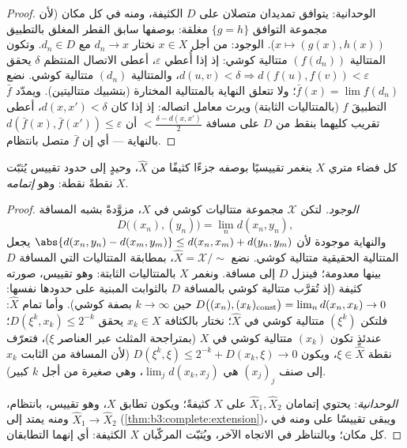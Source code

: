 \begin{proof}
الوحدانية: يتوافق تمديدان متصلان على $D$ الكثيفة، ومنه في كل
مكان (لأن مجموعة التوافق $\{g = h\}$ مغلقة: بوصفها سابق القطر
المغلق بالتطبيق $x\mapsto(g(x), h(x))$). الوجود: من أجل $x \in X$ نختار
$d_n \to x$ مع $d_n \in D$. وتكون المتتالية $(f(d_n))$ متتالية
كوشي: إذ إذا أُعطي $\varepsilon$، أعطى الاتصال المنتظم $\delta$
يحقق $d(u,v) < \delta \Rightarrow
d(f(u), f(v)) < \varepsilon$، والمتتالية $(d_n)$ متتالية كوشي. نضع $\bar f(x) = \lim f(d_n)$؛ ولا
تتعلق النهاية بالمتتالية المختارة (بتشبيك متتاليتين). ويمدّد
$\bar f$ التطبيقَ $f$ (بالمتتاليات الثابتة) ويرث معامل اتصاله:
إذ إذا كان $d(x, x') < \delta$، أعطى تقريب كليهما بنقط من $D$ على مسافة
$< \frac{\delta - d(x,x')}2$ أن $d(\bar f(x), \bar
f(x')) \leq \varepsilon$ بالنهاية --- أي إن $\bar f$ متصل بانتظام.
\end{proof}

\begin{theorem}[الإتمام]\label{thm:b3:complete:completion}
كل فضاء متري $X$ ينغمر تقييسيًا بوصفه جزءًا كثيفًا من  $\hat X$، وحيدٍ إلى حدود تقييس يُثبّت $X$ نقطةً نقطة: وهو
\emph{إتمامه}.
\end{theorem}

\begin{proof}
\emph{الوجود.} لتكن $\mathcal X$ مجموعة متتاليات كوشي في $X$،
مزوَّدةً بشبه المسافة
\[
D\bigl((x_n), (y_n)\bigr) = \lim_n d(x_n, y_n),
\]
والنهاية موجودة لأن $\abs{d(x_n, y_n) - d(x_m, y_m)}
\leq d(x_n, x_m) + d(y_n, y_m)$ يجعل المتتالية الحقيقية متتالية
كوشي. نضع $\hat X = \mathcal X/{\sim}$، بمطابقة المتتاليات التي المسافة $D$ بينها
معدومة؛ فينزل $D$ إلى مسافة. ونغمر $X$ بالمتتاليات الثابتة: وهو
تقييس، صورته كثيفة (إذ تُقرَّب متتالية كوشي بالمسافة $D$
بالثوابت المبنية على حدودها نفسها: $D\bigl((x_n), (x_k)_{\rm
const}\bigr) = \lim_n d(x_n, x_k) \to 0$ حين $k \to \infty$
بصفة كوشي). وأما تمام $\hat X$: فلتكن $(\xi^k)$ متتالية كوشي في
$\hat X$؛ نختار بالكثافة $x_k \in X$ يحقق $D(\xi^k, x_k)
\leq 2^{-k}$؛ عندئذٍ تكون
$(x_k)$ متتالية كوشي في $X$ (بمتراجحة المثلث عبر العناصر
$\xi$)، فتعرّف نقطة $\xi \in \hat
X$، ويكون $D(\xi^k, \xi) \leq 2^{-k} + D(x_k, \xi) \to 0$ (لأن المسافة من الثابت
$x_k$ إلى صنف $(x_j)_j$ هي $\lim_j d(x_k, x_j)$، وهي صغيرة من أجل $k$ كبير).

\emph{الوحدانية}: يحتوي إتمامان $\hat X_1, \hat X_2$ على $X$ كثيفةً؛ ويكون
تطابق $X$، وهو تقييس،  بانتظام، ومنه يمتد إلى $\hat X_1 \to \hat X_2$
(\cref{thm:b3:complete:extension})، ويبقى تقييسًا على  ومنه في كل مكان؛
وبالتناظر في الاتجاه الآخر، ويُثبّت المركّبان $X$ الكثيفة: أي
إنهما التطابقان.
\end{proof}

